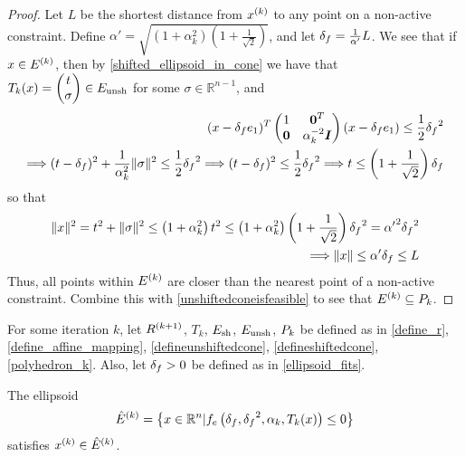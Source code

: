 \begin{proof}
Let $L$ be the shortest distance from $x^{(k)}$ to any point on a non-active constraint. 
Define $\alpha' = \sqrt{\left(1 + \alpha_k^2 \right) \left(1 + \frac 1 {\sqrt{2}}\right)}$, and let ${\delta_{f}} = \frac 1 {\alpha'} L$.
We see that if $x \in {E^{(k)}}$,
then by \cref{shifted_ellipsoid_in_cone} we have that $T_k(x) = \begin{pmatrix}t\\ \sigma\end{pmatrix} \in {E_{\textrm{unsh}}}$ for some $\sigma \in \mathbb R^{n-1}$, and
\begin{align*}
(x - {\delta_{f}} e_1)^T\begin{pmatrix}
1 & \boldsymbol0^T \\
\boldsymbol 0 & \alpha_k^{-2} \boldsymbol I \\
\end{pmatrix}(x - {\delta_{f}} e_1) \le \frac 1 2 {\delta_{f}}^2 \\
\Longrightarrow (t - {\delta_{f}})^2 + \frac {1} {\alpha_k^2} \|\sigma\|^2 \le \frac 1 2 {\delta_{f}}^2
\Longrightarrow (t - {\delta_{f}})^2 \le \frac 1 2 {\delta_{f}}^2
\Longrightarrow t \le \left(1 + \frac 1 {\sqrt{2}}\right) {\delta_{f}}
\end{align*}
so that 
\begin{align*}
\|x\|^2 = t^2 + \|\sigma\|^2 \le \left(1 + \alpha_k^2 \right) t^2 \le \left(1 + \alpha_k^2 \right) \left(1 + \frac 1 {\sqrt{2}}\right) {\delta_{f}}^2 = {\alpha'}^2 {\delta_{f}}^2 \\
\Longrightarrow \|x\| \le \alpha' {\delta_{f}} \le L
\end{align*}
Thus, all points within ${E^{(k)}}$ are closer than the nearest point of a non-active constraint.
Combine this with \cref{unshiftedconeisfeasible} to see that ${E^{(k)}} \subseteq {P_k}$.
\end{proof}



\begin{lemma}
\label{ellipsoid_includes_origin}
For some iteration $k$, let ${R^{(k+1)}}$, $T_k$, ${E_{\textrm{sh}}}$, ${E_{\textrm{unsh}}}$, ${P_k}$ be defined as in
\cref{define_r}, \cref{define_affine_mapping}, \cref{defineunshiftedcone}, \cref{defineshiftedcone}, \cref{polyhedron_k}.
Also, let ${\delta_{f}} > 0$ be defined as in \cref{ellipsoid_fits}.

The ellipsoid
\begin{align}
{{\hat E}^{(k)}}  = \left\{x \in \mathbb R^n | f_e\left({\delta_{f}}, {\delta_{f}}^2, \alpha_k, T_k(x)\right) \le 0\right\} \label{definescaledfeasibleellipsoid}
\end{align}
satisfies $x^{(k)} \in {{\hat E}^{(k)}}$.
\end{lemma}

